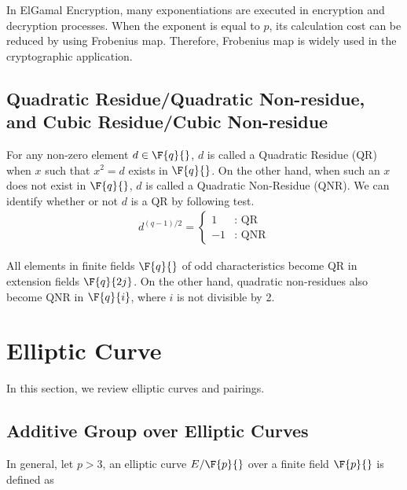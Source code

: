 In ElGamal Encryption, many exponentiations are executed in encryption and decryption processes.
When the exponent is equal to $p$, its calculation cost can be reduced by using Frobenius map.
Therefore, Frobenius map is widely used in the cryptographic application.     

\subsection{Quadratic Residue/Quadratic Non-residue, \\and Cubic Residue/Cubic Non-residue}

For any non-zero element $d\in\F{q}{}$, $d$ is called a Quadratic Residue (QR) when $x$ such that $x^2=d$ exists in $\F{q}{}$.
On the other hand, when such an $x$ does not exist in $\F{q}{}$, $d$ is called a Quadratic Non-Residue (QNR).
We can identify whether or not $d$ is a QR by following test.
\begin{eqnarray}
d^{(q-1)/2} = \left\{
\begin{array}{ll}
1 & \mbox{: QR} \\
-1 & \mbox{: QNR} 
\end{array}
\right.
\end{eqnarray}

All elements in finite fields $\F{q}{}$ of odd characteristics become QR in extension fields $\F{q}{2j}$.
On the other hand, quadratic non-residues also become QNR in $\F{q}{i}$, where $i$ is not divisible by 2.

\section{Elliptic Curve}
In this section, we review elliptic curves and pairings. 

\subsection{Additive Group over Elliptic Curves}

In general, let $p>3$, an elliptic curve $E/\F{p}{}$ over a finite field $\F{p}{}$ is defined as 

